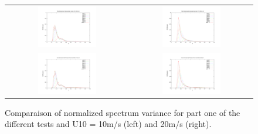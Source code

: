 \begin{figure}[h!]
\begin{tabular}{cc}
\includegraphics[width=0.5\textwidth]{variance_ad_free_mesh_t3_v10.pdf} & \includegraphics[width=0.5\textwidth]{variance_ad_free_mesh_t3_v20.pdf}\\
\includegraphics[width=0.5\textwidth]{variance_ad_free_mesh_t4_v10.pdf} & \includegraphics[width=0.5\textwidth]{variance_ad_free_mesh_t4_v20.pdf}\\
\end{tabular}
\caption{Comparaison of normalized spectrum variance for part one of the different tests and U10 = 10m/s (left) and 20m/s (right).}
\label{variancesfet1}
\end{figure} \begin{figure}[h!]

\end{figure}
